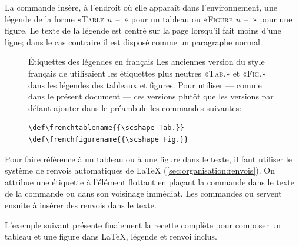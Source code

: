La commande \cmd{\caption} insère,  à l'endroit où elle
apparaît dans l'environnement, une légende de la forme «\textsc{Table}
\emph{n}~--~» pour un tableau ou «\textsc{Figure}
\emph{n}~--~» pour une figure. Le texte de la légende est
centré sur la page lorsqu'il fait moins d'une ligne; dans le cas
contraire il est disposé comme un paragraphe normal.

\begin{figure}[t]
  \begin{emphbox}{Étiquettes des légendes en français}
    Les anciennes version du style français de  utilisaient
    les étiquettes plus neutres «\textsc{Tab.}» et «\textsc{Fig.}»
    dans les légendes des tableaux et figures. Pour utiliser --- comme
    dans le présent document --- ces versions plutôt que les versions
    par défaut ajouter dans le préambule les commandes suivantes:
\begin{lstlisting}
\def\frenchtablename{{\scshape Tab.}}
\def\frenchfigurename{{\scshape Fig.}}
\end{lstlisting}
  \end{emphbox}
\end{figure}

Pour faire référence à un tableau ou à une figure dans le texte, il
faut utiliser le système de renvois automatiques de {\LaTeX}
(\autoref{sec:organisation:renvois}). On attribue une étiquette à l'élément
flottant en plaçant la commande \cmd{\label} dans le texte de la
commande \cmd{\caption} ou dans son voisinage immédiat. Les commandes
\cmd{\ref} ou \cmd{\autoref} servent ensuite à insérer des renvois dans
le texte.

L'exemple suivant présente finalement la recette complète pour composer
un tableau et une figure dans {\LaTeX}, légende et renvoi inclus.

